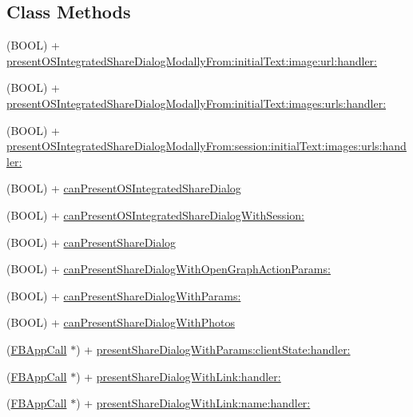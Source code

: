 \subsection*{Class Methods}
\begin{DoxyCompactItemize}
\item 
(B\+O\+OL) + \hyperlink{interfaceFBDialogs_a872dc61b3ce463fea47eec224f8fb635}{present\+O\+S\+Integrated\+Share\+Dialog\+Modally\+From\+:initial\+Text\+:image\+:url\+:handler\+:}
\item 
(B\+O\+OL) + \hyperlink{interfaceFBDialogs_ac4ebf0c4beb5669aadce04ae3b8d8b2b}{present\+O\+S\+Integrated\+Share\+Dialog\+Modally\+From\+:initial\+Text\+:images\+:urls\+:handler\+:}
\item 
(B\+O\+OL) + \hyperlink{interfaceFBDialogs_a923876e895060843c9ee0ce0836f1a7a}{present\+O\+S\+Integrated\+Share\+Dialog\+Modally\+From\+:session\+:initial\+Text\+:images\+:urls\+:handler\+:}
\item 
(B\+O\+OL) + \hyperlink{interfaceFBDialogs_a4239a93d5d1b150b93cf589bca6f46e1}{can\+Present\+O\+S\+Integrated\+Share\+Dialog}
\item 
(B\+O\+OL) + \hyperlink{interfaceFBDialogs_a268b4ee8ee491e006770a51cefa36eeb}{can\+Present\+O\+S\+Integrated\+Share\+Dialog\+With\+Session\+:}
\item 
(B\+O\+OL) + \hyperlink{interfaceFBDialogs_a017ecb9200d66140929cce227723a4d5}{can\+Present\+Share\+Dialog}
\item 
(B\+O\+OL) + \hyperlink{interfaceFBDialogs_ad8921a3906d28210cad0c0871e99f4bd}{can\+Present\+Share\+Dialog\+With\+Open\+Graph\+Action\+Params\+:}
\item 
(B\+O\+OL) + \hyperlink{interfaceFBDialogs_a36e9e390bb8c6040e6027b647ed587e8}{can\+Present\+Share\+Dialog\+With\+Params\+:}
\item 
(B\+O\+OL) + \hyperlink{interfaceFBDialogs_a16156d6a4664e4ea55e351bc78b6e8a7}{can\+Present\+Share\+Dialog\+With\+Photos}
\item 
(\hyperlink{interfaceFBAppCall}{F\+B\+App\+Call} $\ast$) + \hyperlink{interfaceFBDialogs_aea8f6d762fa50f312e7d574d27439349}{present\+Share\+Dialog\+With\+Params\+:client\+State\+:handler\+:}
\item 
(\hyperlink{interfaceFBAppCall}{F\+B\+App\+Call} $\ast$) + \hyperlink{interfaceFBDialogs_ad3172e31c558d23fd2546e482e6ad76a}{present\+Share\+Dialog\+With\+Link\+:handler\+:}
\item 
(\hyperlink{interfaceFBAppCall}{F\+B\+App\+Call} $\ast$) + \hyperlink{interfaceFBDialogs_a5f935e0fdc377b269f9cf021e242f72e}{present\+Share\+Dialog\+With\+Link\+:name\+:handler\+:}

\end{DoxyCompactItemize}
